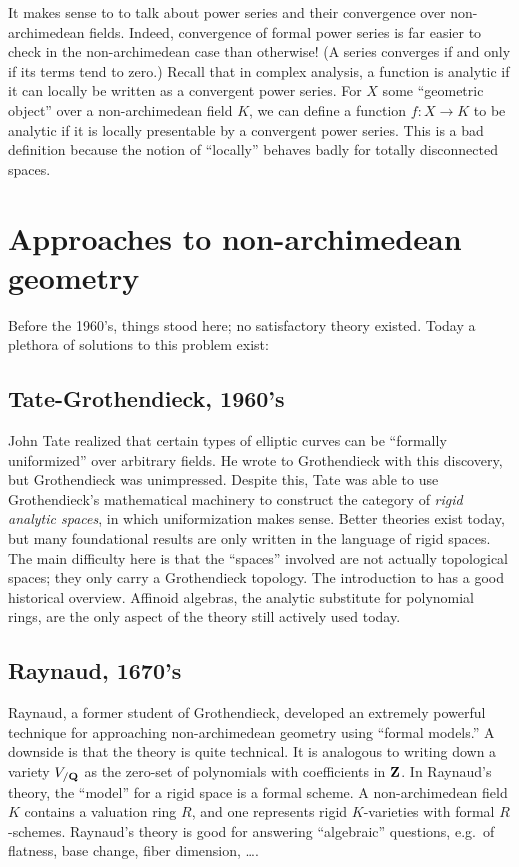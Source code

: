 It makes sense to to talk about power series and their convergence over 
non-archimedean fields. Indeed, convergence of formal power series is far 
easier to check in the non-archimedean case than otherwise! (A series converges 
if and only if its terms tend to zero.) Recall that in complex analysis, 
a function is analytic if it can locally be written as a convergent power 
series. For $X$ some ``geometric object'' over a non-archimedean field $K$, we 
can define a function $f\colon X\to K$ to be analytic if it is 
locally presentable by a convergent power series. This is a bad definition 
because the notion of ``locally'' behaves badly for totally disconnected 
spaces. 





\section{Approaches to non-archimedean geometry}

Before the 1960's, things stood here; no satisfactory theory existed. Today 
a plethora of solutions to this problem exist:

\subsection{Tate-Grothendieck, 1960's}
John Tate realized that certain types of 
elliptic curves can be ``formally uniformized'' over arbitrary fields. He wrote 
to Grothendieck with this discovery, but Grothendieck was unimpressed. Despite 
this, Tate was able to use Grothendieck's mathematical machinery to construct 
the category of \emph{rigid analytic spaces}, in which uniformization makes 
sense. Better theories exist today, but many foundational results are only 
written in the language of rigid spaces. The main difficulty here is that the 
``spaces'' involved are not actually topological spaces; they only carry a 
Grothendieck topology. The introduction to \cite{aws-2008} has a good 
historical overview. Affinoid algebras, the analytic substitute for polynomial 
rings, are the only aspect of the theory still actively used today. 

\subsection{Raynaud, 1670's}
Raynaud, a former student of Grothendieck, developed an extremely 
powerful technique for approaching non-archimedean geometry using ``formal 
models.'' A downside is that the theory is quite technical. It is analogous to 
writing down a variety $V_{/\mathbf{Q}}$ as the zero-set of polynomials with 
coefficients in $\mathbf{Z}$. In Raynaud's theory, the ``model'' for a rigid space is 
a formal scheme. A non-archimedean field $K$ contains a valuation ring $R$, and 
one represents rigid $K$-varieties with formal $R$-schemes. Raynaud's theory is 
good for answering ``algebraic'' questions, e.g.~of flatness, base change, 
fiber dimension, \ldots. 

